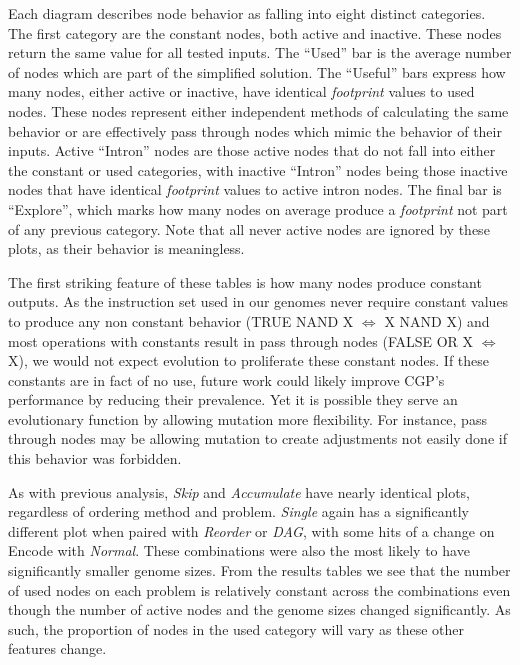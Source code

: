 \documentclass[journal]{IEEEtran}
\begin{document}
Each diagram describes node behavior as falling into eight distinct categories.
The first category are the constant nodes, both active and inactive.  These nodes
return the same value for all tested inputs.  The ``Used'' bar is the average
number of nodes which are part of the simplified solution.  The ``Useful'' bars
express how many nodes, either active or inactive, have identical \emph{footprint}
values to used nodes.  These nodes represent either independent methods of calculating
the same behavior or are effectively pass through nodes which mimic the behavior
of their inputs.  Active ``Intron'' nodes are those active nodes that do not
fall into either the constant or used categories, with inactive ``Intron'' nodes
being those inactive nodes that have identical \emph{footprint} values to active
intron nodes.  The final bar is ``Explore'', which marks how many nodes on
average produce a \emph{footprint} not part of any previous category.  Note that
all never active nodes are ignored by these plots, as their behavior is meaningless.

The first striking feature of these tables is how many nodes produce constant
outputs.  As the instruction set used in our genomes never require constant values
to produce any non constant behavior (TRUE NAND X $\Leftrightarrow$ X NAND X)
and most operations with constants result in pass through nodes
(FALSE OR X $\Leftrightarrow$ X), we would not expect evolution to proliferate
these constant nodes.  If these constants are in fact of no use, future work
could likely improve CGP's performance by reducing their prevalence.  Yet
it is possible they serve an evolutionary function by allowing mutation more
flexibility.  For instance, pass through nodes may be allowing mutation to create
adjustments not easily done if this behavior was forbidden.

As with previous analysis, \emph{Skip} and \emph{Accumulate} have nearly identical
plots, regardless of ordering method and problem.  \emph{Single} again has
a significantly different plot when paired with \emph{Reorder} or \emph{DAG},
with some hits of a change on Encode with \emph{Normal}.  These combinations
were also the most likely to have significantly smaller genome sizes.  From the
results tables we see that the number of used nodes on each problem is relatively
constant across the combinations even though the number of active nodes and the
genome sizes changed significantly.  As such, the proportion of nodes in the
used category will vary as these other features change.
\end{document}

